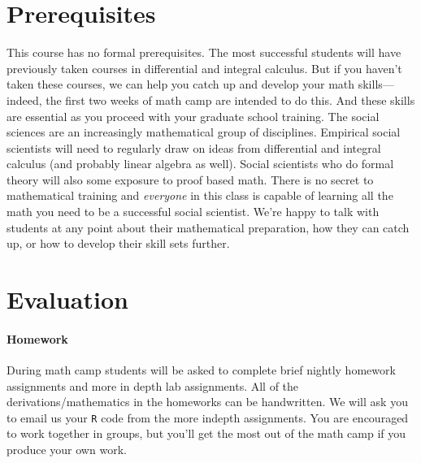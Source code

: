 \documentclass[11pt,letterpaper]{article}
\numberwithin{equation}{section}
\begin{document}
\section*{Prerequisites}
This course has no formal prerequisites. The most successful students will have previously taken courses in differential and integral calculus.  But if you haven't taken these courses, we can help you catch up and develop your math skills---indeed, the first two weeks of math camp are intended to do this.  And these skills are essential as you proceed with your graduate school training.  The social sciences are an increasingly mathematical group of disciplines. Empirical social scientists will need to regularly draw on ideas from differential and integral calculus (and probably linear algebra as well).  Social scientists who do formal theory will also some exposure to proof based math.  There is no secret to mathematical training and \emph{everyone} in this class is capable of learning all the math you need to be a successful social scientist.  We're happy to talk with students at any point about their mathematical preparation, how they can catch up, or how to develop their skill sets further.



\section*{Evaluation}


\paragraph{Homework} During math camp students will be asked to complete brief nightly homework assignments and more in depth lab assignments.  All of the derivations/mathematics in the homeworks can be handwritten.  We will ask you to email us your {\tt R} code from the more indepth assignments.  You are encouraged to work together in groups, but you'll get the most out of the math camp if you produce your own work.     %

\end{document}
